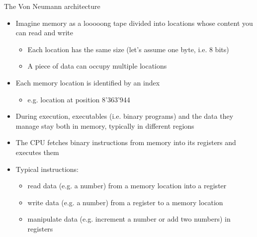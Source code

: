 \begin{frame}{The Von Neumann architecture \insertcontinuationtext}

  \begin{itemize}[<+->]
  \item Imagine memory as a looooong tape divided into locations whose content
    you can read and write
    \begin{itemize}[<.->]
    \item Each location has the same size (let's assume one byte, i.e. 8 bits)
    \item A piece of data can occupy multiple locations
    \end{itemize}
  \item Each memory location is identified by an index
    \begin{itemize}[<.->]
    \item e.g. location at position 8'363'944
    \end{itemize}
  \item During execution, executables (i.e. binary programs) and the data they
    manage stay both in memory, typically in different regions
  \item The CPU fetches binary instructions from memory into its registers and
    executes them
  \item Typical instructions:
    \begin{itemize}[<.->]
    \item read data (e.g. a number) from a memory location into a register
    \item write data (e.g. a number) from a register to a memory location
    \item manipulate data (e.g. increment a number or add two numbers) in
      registers
    \end{itemize}
  \end{itemize}
\end{frame}

